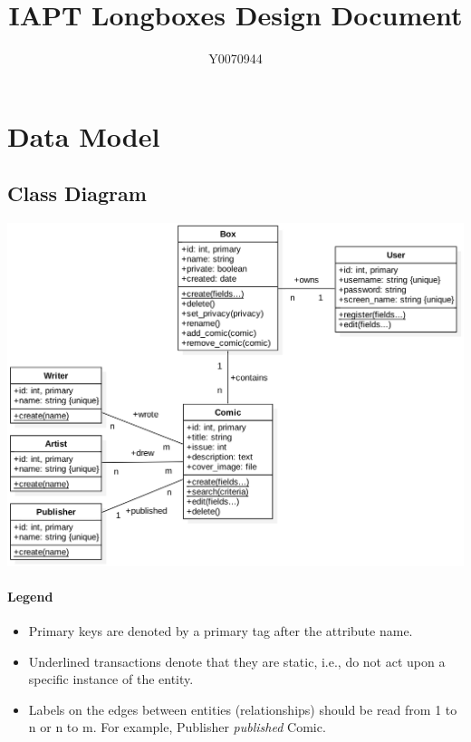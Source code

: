 \documentclass[fontsize=12pt,a4paper]{scrreprt}
\author{Y0070944}
\title{IAPT Longboxes Design Document}
\begin{document}
\maketitle
\setcounter{page}{1}

\chapter{Data Model}

\section{Class Diagram}

\includegraphics[width=\textwidth]{uml.png}

\subsubsection{Legend}
\begin{itemize}
  \item Primary keys are denoted by a \textsf{primary} tag after the attribute name.
  \item Underlined transactions denote that they are static, i.e., do not act upon a specific instance of the entity.
  \item Labels on the edges between entities (relationships) should be read from \textsf{1 to n} or \textsf{n to m}. For example, \textsf{Publisher \emph{published} Comic}.
\end{itemize}
\end{document}
